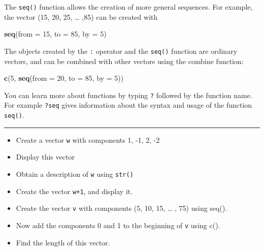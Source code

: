 \documentclass[
]{book}
\newenvironment{Shaded}{\begin{snugshade}}{\end{snugshade}}
\newcommand{\AttributeTok}[1]{\textcolor[rgb]{0.13,0.29,0.53}{#1}}
\newcommand{\DecValTok}[1]{\textcolor[rgb]{0.00,0.00,0.81}{#1}}
\newcommand{\FunctionTok}[1]{\textcolor[rgb]{0.13,0.29,0.53}{\textbf{#1}}}
\newcommand{\NormalTok}[1]{#1}
\begin{document}
The \texttt{seq()} function allows the creation of more general
sequences. For example, the vector (15, 20, 25, \ldots{} ,85) can be created
with

\begin{Shaded}
\begin{Highlighting}[]
\FunctionTok{seq}\NormalTok{(}\AttributeTok{from =} \DecValTok{15}\NormalTok{, }\AttributeTok{to =} \DecValTok{85}\NormalTok{, }\AttributeTok{by =} \DecValTok{5}\NormalTok{)}
\end{Highlighting}
\end{Shaded}

The objects created by the \texttt{:} operator and the \texttt{seq()} function
are ordinary vectors, and can be combined with other vectors using the
combine function:

\begin{Shaded}
\begin{Highlighting}[]
\FunctionTok{c}\NormalTok{(}\DecValTok{5}\NormalTok{, }\FunctionTok{seq}\NormalTok{(}\AttributeTok{from =} \DecValTok{20}\NormalTok{, }\AttributeTok{to =} \DecValTok{85}\NormalTok{, }\AttributeTok{by =} \DecValTok{5}\NormalTok{))}
\end{Highlighting}
\end{Shaded}

You can learn more about functions by typing \texttt{?} followed by the
function name. For example \texttt{?seq} gives information about the
syntax and usage of the function \texttt{seq()}.

\begin{center}\rule{0.5\linewidth}{0.5pt}\end{center}

\begin{itemize}
\item
  Create a vector \texttt{w} with components 1, -1, 2, -2
\item
  Display this vector
\item
  Obtain a description of \texttt{w} using \texttt{str()}
\item
  Create the vector \texttt{w+1}, and display it.
\item
  Create the vector \texttt{v} with components (5, 10, 15, \ldots{} , 75) using seq().
\item
  Now add the components 0 and 1 to the beginning of \texttt{v} using c().
\item
  Find the length of this vector.
\end{itemize}
\end{document}
